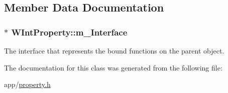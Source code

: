 \subsection{Member Data Documentation}
\hypertarget{class_w_int_property_a7c4faa1f37d022fe9bc1bd2da01c2213}{
\subsubsection[{m\-\_\-\-Interface}]{$\ast$ W\-Int\-Property\-::m\-\_\-\-Interface\hspace{0.3cm}{\ttfamily [protected]}}}\label{class_w_int_property_a7c4faa1f37d022fe9bc1bd2da01c2213}
The interface that represents the bound functions on the parent object. 

The documentation for this class was generated from the following file\-:\begin{DoxyCompactItemize}
\item 
app/\hyperlink{property_8h}{property.\-h}\end{DoxyCompactItemize}

